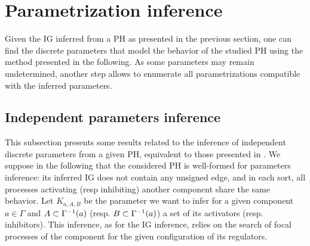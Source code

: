 \section{Parametrization inference}\label{sec:infer-K}

Given the IG inferred from a PH as presented in the previous section, one can find the discrete parameters that model the behavior of the studied PH using the method presented in the following.
As some parameters may remain undetermined, another step allows to enumerate all parametrizations compatible with the inferred parameters.


\subsection{Independent parameters inference}

This subsection presents some results related to the inference of independent discrete parameters from a given PH,
equivalent to those presented in \cite{PMR10-TCSB}.
We suppose in the following that the considered PH is well-formed for parameters inference: its inferred IG does not contain any unsigned edge,
and in each sort, all processes activating (resp inhibiting) another component share the same behavior.
Let $K_{a,A,B}$ be the parameter we want to infer for a given component $a \in \Gamma$
and $A \subset \Gamma^{-1}(a)$ (resp. $B \subset \Gamma^{-1}(a)$) a set of its activators (resp. inhibitors).
This inference, as for the IG inference, relies on the search of focal processes of the component for the given configuration of its regulators.

